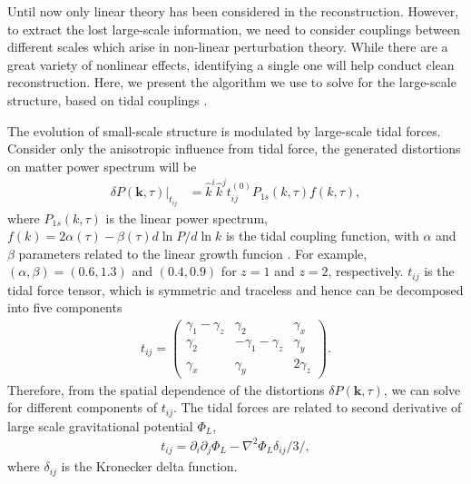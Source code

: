 Until now only linear theory has been considered in the reconstruction. However, to extract the lost large-scale information, we need to consider couplings between different scales which arise in non-linear perturbation theory. While there are a great variety of nonlinear effects, identifying a single one will help conduct clean reconstruction.  Here, we present the algorithm we use to solve for the large-scale structure, based on tidal couplings \cite{2015:zhu,2012:pen}.  

The evolution of small-scale structure is modulated by large-scale tidal forces. Consider only the anisotropic influence from tidal force, the generated distortions on matter power spectrum will be 
\begin{align}
\label{eq:powerdistort}
\delta P(\bm{k},\tau)|_{t_{ij}} &=
\hat{k}^i\hat{k}^jt_{ij}^{(0)}P_{1s}(k,\tau)f(k,\tau),
\end{align}
where $P_{1s}(k,\tau)$ is the linear power spectrum, $f(k)=2\alpha(\tau)-\beta(\tau)d\ln P/d\ln k$ is the tidal coupling function, with $\alpha$ and $\beta$ parameters related to the linear growth funcion \cite{2015:zhu}. For example, $(\alpha,\beta)=(0.6,1.3)$ and $(0.4, 0.9)$ for $z=1$ and $z=2$, respectively. 
$t_{ij}$ is the tidal force tensor, which is symmetric and traceless and hence can be decomposed into five components 
\begin{eqnarray}
t_{ij}=\left( \begin{array}{ccc}
\gamma_{1}-\gamma_{z} & \gamma_{2} & \gamma_{x}\\
\gamma_{2} & -\gamma_{1}-\gamma_{z} & \gamma_{y}\\
\gamma_{x} & \gamma_{y} & 2\gamma_z
\end{array} \right).
\end{eqnarray}
Therefore, from the spatial dependence of the distortions $\delta P(\bm{k},\tau)$, we can solve for different components of $t_{ij}$. The tidal forces are related to second derivative of large scale gravitational potential $\Phi_L$,  
\begin{eqnarray}
\label{eq:tij}
t_{ij}=\partial_i\partial_j\Phi_{L}-\nabla^2\Phi_L\delta_{ij}/3 /,
\end{eqnarray}
where $\delta_{ij}$ is the Kronecker delta function.

